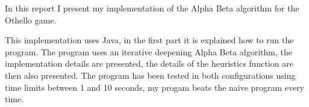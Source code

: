 In this report I present my implementation of the Alpha Beta algorithm for the Othello game.

This implementation uses Java, in the first part it is explained how to run the program.
The program uses an iterative deepening Alpha Beta algorithm, the implementation details are presented, the details of the heuristics function are then also presented.
The program has been tested in both configurations using time limits between 1 and 10 seconds, my progam beats the naive program every time.
